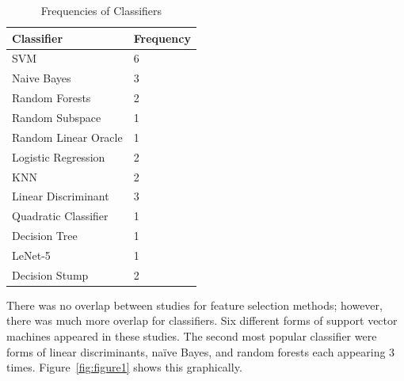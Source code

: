 \documentclass[pageno]{jpaper}
\begin{document}
\begin{table}[!ht]
    \centering
    \caption{Frequencies of Classifiers}
\label{Classifier_frequency}
    \begin{tabular}{@{}|l|l|@{}}
        \toprule
        Classifier           & Frequency \\ \midrule
        \rowcolor[HTML]{C0C0C0}
        SVM                  & 6         \\ \midrule
        Naive Bayes          & 3         \\ \midrule
        \rowcolor[HTML]{C0C0C0}
        Random Forests       & 2         \\ \midrule
        Random Subspace      & 1         \\ \midrule
        \rowcolor[HTML]{C0C0C0}
        Random Linear Oracle & 1         \\ \midrule
        Logistic Regression  & 2         \\ \midrule
        \rowcolor[HTML]{C0C0C0}
        KNN                  & 2         \\ \midrule
        Linear Discriminant  & 3         \\ \midrule
        \rowcolor[HTML]{C0C0C0}
        Quadratic Classifier & 1         \\ \midrule
        Decision Tree        & 1         \\ \midrule
        \rowcolor[HTML]{C0C0C0}
        LeNet-5              & 1         \\ \midrule
        Decision Stump       & 2         \\ \bottomrule
    \end{tabular}
\end{table}

There was no overlap between studies for feature selection methods; however,
there was much more overlap for classifiers. Six different forms of support
vector machines appeared in these studies. The second most popular classifier
were forms of linear discriminants, naïve Bayes, and random forests each 
appearing 3 times. Figure~\ref{fig:figure1} shows this graphically.
\end{document}

